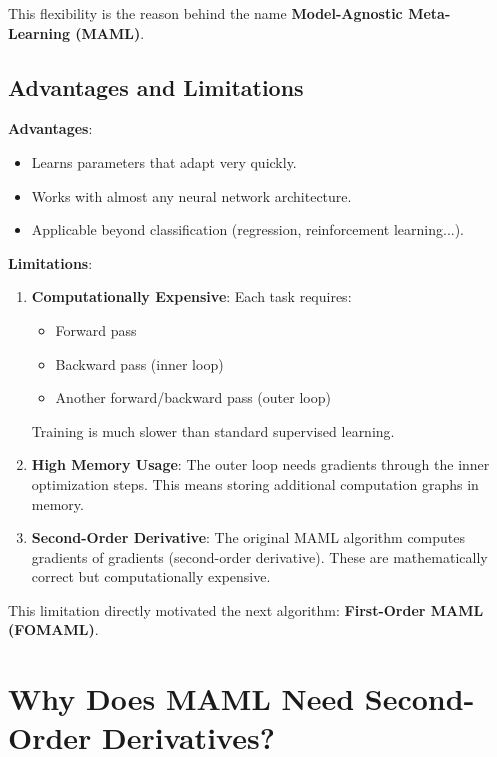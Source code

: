 This flexibility is the reason behind the name \textbf{Model-Agnostic Meta-Learning (MAML)}.

\subsection*{Advantages and Limitations}

\textbf{Advantages}:
\begin{itemize}
    \item Learns parameters that adapt very quickly.
    \item Works with almost any neural network architecture.
    \item Applicable beyond classification (regression, reinforcement learning...).
\end{itemize}

\textbf{Limitations}:
\begin{enumerate}
    \item \textbf{Computationally Expensive}: Each task requires:
    \begin{itemize}
        \item Forward pass
        \item Backward pass (inner loop)
        \item Another forward/backward pass (outer loop)
    \end{itemize}
    Training is much slower than standard supervised learning.

    \item \textbf{High Memory Usage}: The outer loop needs gradients through the inner optimization steps. This means storing additional computation graphs in memory.

    \item \textbf{Second-Order Derivative}: The original MAML algorithm computes gradients of gradients (second-order derivative). These are mathematically correct but computationally expensive.
\end{enumerate}

This limitation directly motivated the next algorithm: \textbf{First-Order MAML (FOMAML)}.

\section{Why Does MAML Need Second-Order Derivatives?}

